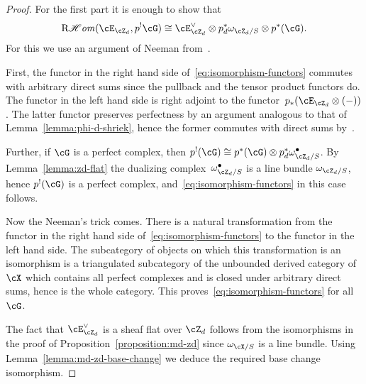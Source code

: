 \documentclass[11pt]{amsart}
\DeclareMathOperator{\RCHom}{\mathrm{R}\mathscr{H}\mathit{om}}
\theoremstyle{plain}
\theoremstyle{definition}
\theoremstyle{remark}
\begin{document}
\begin{proof}
For the first part it is enough to show that 
\begin{equation}
\label{eq:isomorphism-functors}
\RCHom(\cE_{\cZ_d},p^!\cG) \cong \cE_{\cZ_d}^\vee \otimes p_d^*\omega_{\cZ_d/S} \otimes p^*(\cG).
\end{equation}
For this we use an argument of Neeman from~\cite[Theorem~5.4]{neeman1996grothendieck}.

First, the functor in the right hand side of~\eqref{eq:isomorphism-functors} 
commutes with arbitrary direct sums since the pullback and the tensor product functors do.
The functor in the left hand side is right adjoint to the functor~$p_*(\cE_{\cZ_d} \otimes (-))$.
The latter functor preserves perfectness by an argument analogous to that of Lemma~\ref{lemma:phi-d-shriek},
hence the former commutes with direct sums by~\cite[Theorem~5.1]{neeman1996grothendieck}.

Further, if $\cG$ is a perfect complex, then $p^!(\cG) \cong p^*(\cG) \otimes p_d^*\omega^\bullet_{\cZ_d/S}$.
By Lemma~\ref{lemma:zd-flat} the dualizing complex~$\omega^\bullet_{\cZ_d/S}$ is a line bundle $\omega_{\cZ_d/S}$, 
hence $p^!(\cG)$ is a perfect complex, and~\eqref{eq:isomorphism-functors} in this case follows.

Now the Neeman's trick comes.
There is a natural transformation from the functor in the right hand side of~\eqref{eq:isomorphism-functors} 
to the functor in the left hand side.
The subcategory of objects on which this transformation is an isomorphism is 
a triangulated subcategory of the unbounded derived category of $\cX$ 
which contains all perfect complexes and is closed under arbitrary direct sums, hence is the whole category.
This proves~\eqref{eq:isomorphism-functors} for all $\cG$.


The fact that $\cE_{\cZ_d}^\vee$ is a sheaf flat over $\cZ_d$ follows from the isomorphisms
in the proof of Proposition~\ref{proposition:md-zd} since $\omega_{\cX/S}$ is a line bundle.
Using Lemma~\ref{lemma:md-zd-base-change} we deduce the required base change isomorphism.
\end{proof}
\end{document}

